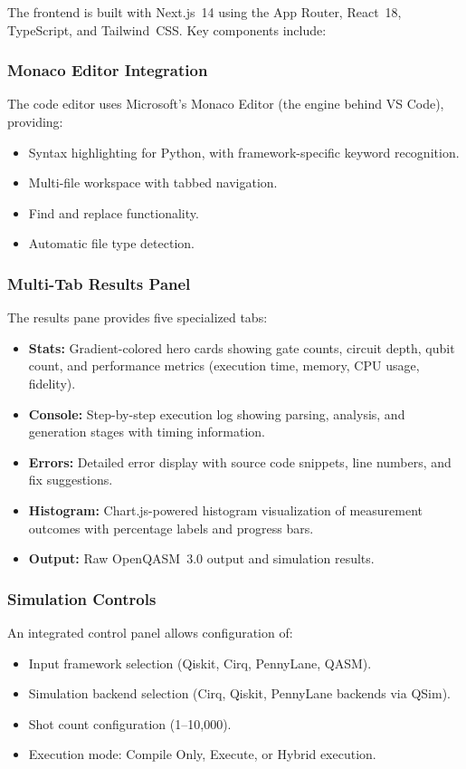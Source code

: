 \documentclass[conference]{IEEEtran}
\begin{document}
The frontend is built with Next.js~14 using the App Router, React~18, TypeScript, and Tailwind~CSS. Key components include:

\subsubsection{Monaco Editor Integration}
The code editor uses Microsoft's Monaco Editor (the engine behind VS Code), providing:
\begin{itemize}
    \item Syntax highlighting for Python, with framework-specific keyword recognition.
    \item Multi-file workspace with tabbed navigation.
    \item Find and replace functionality.
    \item Automatic file type detection.
\end{itemize}

\subsubsection{Multi-Tab Results Panel}
The results pane provides five specialized tabs:
\begin{itemize}
    \item \textbf{Stats:} Gradient-colored hero cards showing gate counts, circuit depth, qubit count, and performance metrics (execution time, memory, CPU usage, fidelity).
    \item \textbf{Console:} Step-by-step execution log showing parsing, analysis, and generation stages with timing information.
    \item \textbf{Errors:} Detailed error display with source code snippets, line numbers, and fix suggestions.
    \item \textbf{Histogram:} Chart.js-powered histogram visualization of measurement outcomes with percentage labels and progress bars.
    \item \textbf{Output:} Raw OpenQASM~3.0 output and simulation results.
\end{itemize}

\subsubsection{Simulation Controls}
An integrated control panel allows configuration of:
\begin{itemize}
    \item Input framework selection (Qiskit, Cirq, PennyLane, QASM).
    \item Simulation backend selection (Cirq, Qiskit, PennyLane backends via QSim).
    \item Shot count configuration (1--10,000).
    \item Execution mode: Compile Only, Execute, or Hybrid execution.
\end{itemize}
\end{document}
